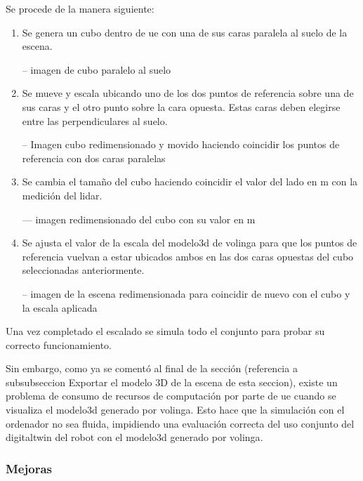 \documentclass[a4paper, 12pt, spanish, twoside]{article}
\begin{document}
Se procede de la manera siguiente: 

\begin{enumerate} 

\item Se genera un cubo dentro de \acrshort{ue} con una de sus caras paralela al suelo de la escena. 

-- imagen de cubo paralelo al suelo 

\item Se mueve y escala ubicando uno de los dos puntos de referencia sobre una de sus caras y el otro punto sobre la cara opuesta. Estas caras deben elegirse entre las perpendiculares al suelo. 

-- Imagen cubo redimensionado y movido haciendo coincidir los puntos de referencia con dos caras paralelas 

\item Se cambia el tamaño del cubo haciendo coincidir el valor del lado en \acrshort{m} con la medición del \acrshort{lidar}. 

--- imagen redimensionado del cubo con su valor en m 

\item Se ajusta el valor de la escala del \gls{modelo3d} de \gls{volinga} para que los puntos de referencia vuelvan a estar ubicados ambos en las dos caras opuestas del cubo seleccionadas anteriormente. 

-- imagen de la escena redimensionada para coincidir de nuevo con el cubo y la escala aplicada 

\end{enumerate} 

Una vez completado el escalado se simula todo el conjunto para probar su correcto funcionamiento. 

Sin embargo, como ya se comentó al final de la sección (referencia a subsubseccion Exportar el modelo 3D de la escena de esta seccion), existe un problema de consumo de recursos de computación por parte de \acrshort{ue} cuando se visualiza el \gls{modelo3d} generado por \gls{volinga}. Esto hace que la simulación con el ordenador no sea fluida, impidiendo una evaluación correcta del uso conjunto del \gls{digitaltwin} del robot con el \gls{modelo3d} generado por \gls{volinga}. 

\subsubsection{Mejoras} \label{sec:implementacion:nerfstudio-volinga:mejoras}
\end{document}
